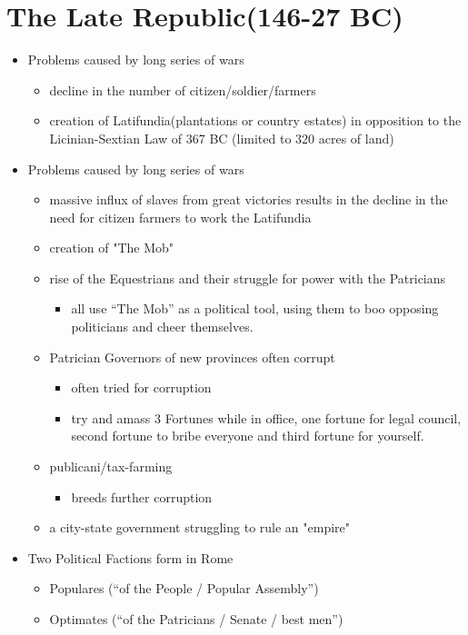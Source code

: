 \documentclass[12pt, twoside]{article}
\begin{document}
\section{The Late Republic(146-27 BC)}
\begin{itemize}
\item Problems caused by long series of wars
	\begin{itemize}
	\item decline in the number of citizen/soldier/farmers
	\item creation of Latifundia(plantations or country estates) in opposition to the Licinian-Sextian Law of 367 BC (limited to 320 acres of land)
	\end{itemize}
\item Problems caused by long series of wars
	\begin{itemize}
	\item massive influx of slaves from great victories results in the decline in the need for citizen farmers to work the Latifundia
	\item creation of "The Mob"
	\item rise of the Equestrians and their struggle for power with the Patricians
		\begin{itemize}
		\item all use “The Mob” as a political tool, using them to boo opposing politicians and cheer themselves.
		\end{itemize}
	\item Patrician Governors of new provinces often corrupt
		\begin{itemize}
		\item often tried for corruption
		\item try and amass 3 Fortunes while in office, one fortune for legal council, second fortune to bribe everyone and third fortune for yourself.
		\end{itemize}
	\item publicani/tax-farming
		\begin{itemize}
		\item breeds further corruption
		\end{itemize}
	\item a city-state government struggling to rule an "empire"
	\end{itemize}
\item Two Political Factions form in Rome
	\begin{itemize}
	\item Populares (“of the People / Popular Assembly”)
	\item Optimates (“of the Patricians / Senate / best men”)
	\end{itemize}
\end{itemize}
\end{document}
